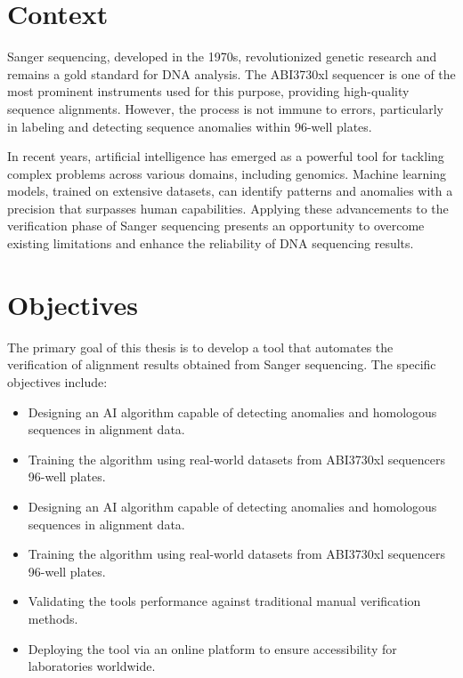 \section{Context}
\label{sec:Context}

\ntindex[Context]{}

Sanger sequencing, developed in the 1970s, revolutionized genetic research and remains a gold standard for DNA analysis. The ABI3730xl sequencer is one of the most prominent instruments used for this purpose, providing high-quality sequence alignments. However, the process is not immune to errors, particularly in labeling and detecting sequence anomalies within 96-well plates.

In recent years, artificial intelligence has emerged as a powerful tool for tackling complex problems across various domains, including genomics. Machine learning models, trained on extensive datasets, can identify patterns and anomalies with a precision that surpasses human capabilities. Applying these advancements to the verification phase of Sanger sequencing presents an opportunity to overcome existing limitations and enhance the reliability of DNA sequencing results.


\section{Objectives}
\label{sec:Objectives}

The primary goal of this thesis is to develop a tool that automates the verification of alignment results obtained from Sanger sequencing. The specific objectives include:

\begin{itemize}
  \item Designing an AI algorithm capable of detecting anomalies and homologous sequences in alignment data.
  \item Training the algorithm using real-world datasets from ABI3730xl sequencers 96-well plates.
  \item Designing an AI algorithm capable of detecting anomalies and homologous sequences in alignment data.
  \item Training the algorithm using real-world datasets from ABI3730xl sequencers 96-well plates.
  \item Validating the tools performance against traditional manual verification methods.
  \item Deploying the tool via an online platform to ensure accessibility for laboratories worldwide.
\end{itemize}

